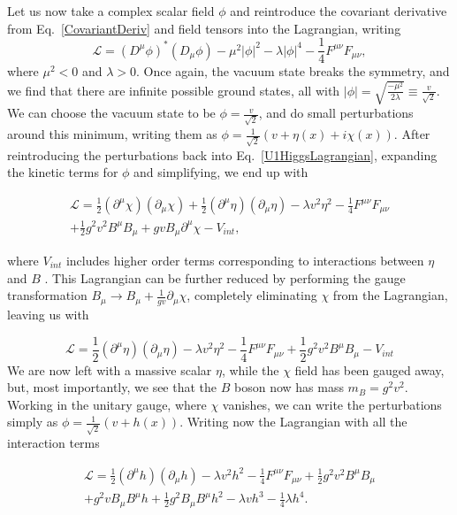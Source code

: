 \documentclass[EPJ,twocolumn]{webofc}
\begin{document}
Let us now take a complex scalar field $\phi$ and reintroduce the covariant derivative from Eq.~\eqref{CovariantDeriv} and field tensors into the Lagrangian, writing
\begin{equation}
    \mathcal{L} = \left( D^{\mu}\phi\right)^* \left( D_{\mu}\phi\right) -\mu^2|\phi|^2-\lambda|\phi|^4-\frac{1}{4}F^{\mu\nu}F_{\mu\nu},
    \label{U1HiggsLagrangian}
\end{equation}
where $\mu^2<0$ and $\lambda>0$. Once again, the vacuum state breaks the symmetry, and we find that there are infinite possible ground states, all with $|\phi|=\sqrt{\frac{-\mu^2}{2\lambda}}\equiv \frac{v}{\sqrt{2}}$. We can choose the vacuum state to be $\phi = \frac{v}{\sqrt{2}}$, and do small perturbations around this minimum, writing them as $\phi = \frac{1}{\sqrt{2}}\left(v+\eta(x)+i\chi(x)\right)$.
After reintroducing the perturbations back into Eq.~\eqref{U1HiggsLagrangian}, expanding the kinetic terms for $\phi$ and simplifying, we end up with

\begin{multline}
    \mathcal{L} = \frac{1}{2}\left(\partial^{\mu}\chi\right)\left(\partial_{\mu}\chi\right)+\frac{1}{2}\left(\partial^{\mu}\eta\right)\left(\partial_{\mu}\eta\right)-\lambda v^2 \eta^2 
-\frac{1}{4}F^{\mu\nu}F_{\mu\nu}\\ +\frac{1}{2}g^2v^2B^{\mu}B_{\mu}+gvB_{\mu}\partial^{\mu}\chi-V_{int},
\end{multline}


where $V_{int}$ includes higher order terms corresponding to interactions between $\eta$ and $B$ . This Lagrangian can be further reduced by performing the gauge transformation $B_{\mu}\rightarrow B_{\mu}+\frac{1}{gv}\partial_{\mu}\chi$, completely eliminating $\chi$ from the Lagrangian, leaving us with 

\begin{equation}
    \mathcal{L} = \frac{1}{2}\left(\partial^{\mu}\eta\right)\left(\partial_{\mu}\eta\right)-\lambda v^2 \eta^2 
-\frac{1}{4}F^{\mu\nu}F_{\mu\nu} 
+\frac{1}{2}g^2v^2B^{\mu}B_{\mu}-V_{int}
\end{equation}
We are now left with a massive scalar $\eta$, while the $\chi$ field has been gauged away, but, most importantly, we see that the $B$ boson now has mass $m_B = g^2v^2$. Working in the unitary gauge, where $\chi$ vanishes, we can write the perturbations simply as $\phi = \frac{1}{\sqrt{2}}\left( v + h(x)\right)$. Writing now the Lagrangian with all the interaction terms

\begin{multline}
    \mathcal{L} = \frac{1}{2}\left(\partial^{\mu}h\right)\left(\partial_{\mu}h\right)-\lambda v^2 h^2 
-\frac{1}{4}F^{\mu\nu}F_{\mu\nu}+\frac{1}{2}g^2v^2B^{\mu}B_{\mu} \\ +
g^2vB_{\mu}B^{\mu}h+\frac{1}{2}g^2B_{\mu}B^{\mu}h^2-\lambda vh^3-\frac{1}{4}\lambda h^4.
\end{multline}
    
\end{document}
